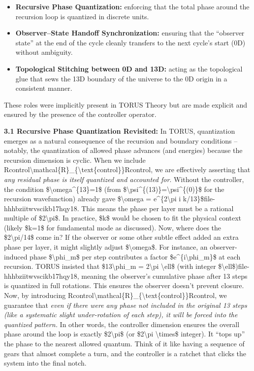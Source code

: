 \documentclass[]{article}
\begin{document}
{{\begin{itemize}
\item
  \textbf{Recursive Phase Quantization:} enforcing that the total phase
  around the recursion loop is quantized in discrete units.
\item
  \textbf{Observer--State Handoff Synchronization:} ensuring that the
  ``observer state'' at the end of the cycle cleanly transfers to the
  next cycle's start (0D) without ambiguity.
\item
  \textbf{Topological Stitching between 0D and 13D:} acting as the
  topological glue that sews the 13D boundary of the universe to the 0D
  origin in a consistent manner.
\end{itemize}

These roles were implicitly present in TORUS Theory but are made
explicit and ensured by the presence of the controller operator.

\textbf{3.1 Recursive Phase Quantization Revisited:} In TORUS,
quantization emerges as a natural consequence of the recursion and
boundary conditions -- notably, the quantization of allowed phase
advances (and energies) because the recursion dimension is cyclic​. When
we include
Rcontrol\textbackslash{}mathcal\{R\}\_\{\textbackslash{}text\{control\}\}Rcontrol​,
we are effectively asserting that \emph{any residual phase is itself
quantized and accounted for}. Without the controller, the condition
\$\textbackslash{}omega\^{}\{13\}=1\$ (from
\$\textbackslash{}psi\^{}\{(13)\}=\textbackslash{}psi\^{}\{(0)\}\$ for
the recursion wavefunction) already gave \$\textbackslash{}omega =
e\^{}\{2\textbackslash{}pi i k/13\}\$​file-hhhbziitwvscikb17hqy18. This
means the phase per layer must be a rational multiple of
\$2\textbackslash{}pi\$. In practice, \$k\$ would be chosen to fit the
physical context (likely \$k=1\$ for fundamental mode as discussed).
Now, where does the \$2\textbackslash{}pi/14\$ come in? If the observer
or some other subtle effect added an extra phase per layer, it might
slightly adjust \$\textbackslash{}omega\$. For instance, an
observer-induced phase \$\textbackslash{}phi\_m\$ per step contributes a
factor \$e\^{}\{i\textbackslash{}phi\_m\}\$ at each recursion​. TORUS
insisted that \$13\textbackslash{}phi\_m = 2\textbackslash{}pi
\textbackslash{}ell\$ (with integer
\$\textbackslash{}ell\$)​file-hhhbziitwvscikb17hqy18, meaning the
observer's cumulative phase after 13 steps is quantized in full
rotations. This ensures the observer doesn't prevent closure. Now, by
introducing
Rcontrol\textbackslash{}mathcal\{R\}\_\{\textbackslash{}text\{control\}\}Rcontrol​,
we guarantee that \emph{even if there were any phase not included in the
original 13 steps (like a systematic slight under-rotation of each
step), it will be forced into the quantized pattern.} In other words,
the controller dimension ensures the overall phase around the loop is
exactly \$2\textbackslash{}pi\$ (or \$2\textbackslash{}pi
\textbackslash{}times\$ integer). It ``tops up'' the phase to the
nearest allowed quantum. Think of it like having a sequence of gears
that almost complete a turn, and the controller is a ratchet that clicks
the system into the final notch.

}}
\end{document}
